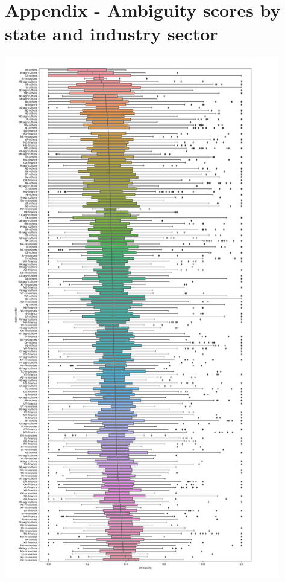 \documentclass{custom_report}
\begin{document}



\section*{Appendix - Ambiguity scores by state and industry sector}
\centerline{\includegraphics[width=12cm]{images/uss_ambiguity_state_sector.png}}
\end{document}

